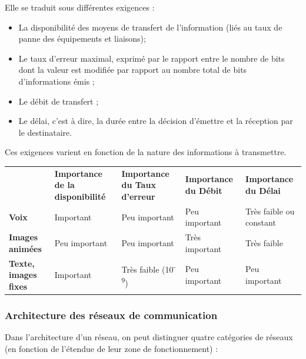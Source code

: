Elle se traduit sous différentes exigences :

\begin{itemize}
\item
  La disponibilité des moyens de transfert de l'information (liés au taux de panne des équipements et liaisons);
\item
  Le taux d'erreur maximal, exprimé par le rapport entre le nombre de bits dont la valeur est modifiée par rapport au nombre total de bits d'informations émis ;
\item
  Le débit de transfert ;
\item
  Le délai, c'est à dire, la durée entre la décision d'émettre et la réception par le destinataire.
\end{itemize}

Ces exigences varient en fonction de la nature des informations à transmettre.

\begin{longtable}[]{@{}
  >{\raggedright\arraybackslash}p{}
  >{\raggedright\arraybackslash}p{}
  >{\raggedright\arraybackslash}p{}
  >{\raggedright\arraybackslash}p{}
  >{\raggedright\arraybackslash}p{}@{}}
\toprule\noalign{}
\endhead
\bottomrule\noalign{}
\endlastfoot
& \textbf{Importance de la disponibilité} & \textbf{Importance du Taux d'erreur} & \textbf{Importance du Débit} & \textbf{Importance du Délai} \\
\textbf{Voix} & Important & Peu important & Peu important & Très faible ou constant \\
\textbf{Images animées} & Peu important & Peu important & Très important & Très faible \\
\textbf{Texte, images fixes} & Important & Très faible (10\textsuperscript{-9}) & Peu important & Peu important \\
\end{longtable}

\hypertarget{architecture-des-ruxe9seaux-de-communication}{%
\subsubsection{Architecture des réseaux de communication}\label{architecture-des-ruxe9seaux-de-communication}}

Dans l'architecture d'un réseau, on peut distinguer quatre catégories de réseaux (en fonction de l'étendue de leur zone de fonctionnement) :

